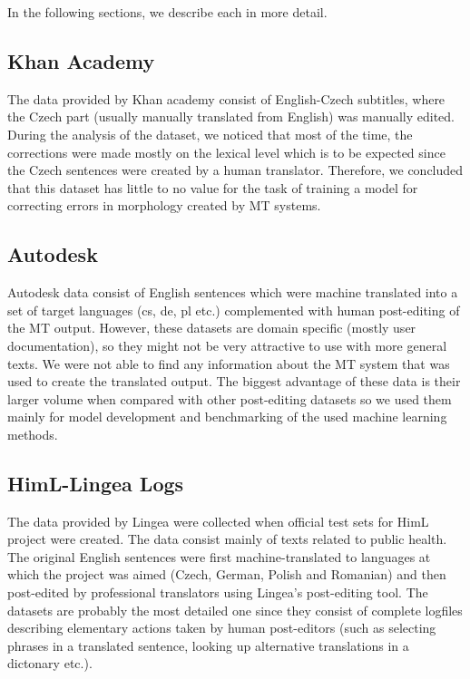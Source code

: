 In the following sections, we describe each in more detail.

\subsection{Khan Academy}

The data provided by Khan academy consist of English-Czech subtitles,
where the Czech part (usually manually translated from English) was manually
edited. During the analysis of the dataset,
we noticed that most of the time, the corrections were made
mostly on the lexical level which is to be expected since the Czech sentences
were created by a human translator.
Therefore, we concluded that this dataset has little to no value
for the task of training a model for correcting errors in morphology created by MT systems.


\subsection{Autodesk}

Autodesk data consist of English sentences which were machine translated into
a set of target languages (cs, de, pl etc.) complemented with human post-editing
of the MT output. However, these datasets are domain specific (mostly user documentation),
so they might not be very attractive to use with more general texts.
We were not able to find any information about the MT system that was used
to create the translated output. The biggest advantage of these data is
their larger volume when compared with other post-editing datasets so we
used them mainly for model development and benchmarking of the used machine
learning methods.

\subsection{HimL-Lingea Logs}

The data provided by Lingea were collected when official test sets for
HimL project were
created. The data consist mainly of texts related to public health.
The original English sentences were first
machine-translated to languages at which
the project was aimed (Czech, German, Polish and Romanian)
and then post-edited by professional
translators using Lingea's post-editing tool. The datasets are probably the most
detailed one since they consist of complete logfiles
describing elementary actions taken by human post-editors (such as selecting
phrases in a translated sentence, looking up alternative translations
in a dictonary etc.).

